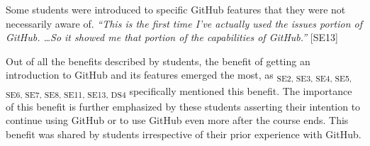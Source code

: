 Some students were introduced to specific GitHub features that they were not necessarily aware of. \textit{``This is the first time I've actually used the issues portion of GitHub. \ldots So it showed me that portion of the capabilities of GitHub.''} [SE13]

Out of all the benefits described by students, the benefit of getting an introduction to GitHub and its features emerged the most, as \textsubscript{SE2, SE3, SE4, SE5, SE6, SE7, SE8, SE11, SE13, DS4} specifically mentioned this benefit. The importance of this benefit is further emphasized by these students asserting their intention to continue using GitHub or to use GitHub even more after the course ends. This benefit was shared by students irrespective of their prior experience with GitHub. \\






